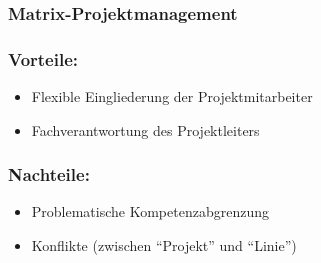 \documentclass[11pt,a4paper]{article}
\begin{document}
\vspace{1cm}
\subsubsection{Matrix-Projektmanagement}
\begin{minipage}[c]{0.5\textwidth}
	\subsubsection*{Vorteile:}

	\begin{itemize}
	\itemsep0em
		\item Flexible Eingliederung der Projektmitarbeiter
		\item Fachverantwortung des Projektleiters
	\end{itemize}
	\subsubsection*{Nachteile:}

	\begin{itemize}
	\itemsep0em
		\item Problematische Kompetenzabgrenzung
		\item Konflikte (zwischen ``Projekt'' und ``Linie'')
	\end{itemize}
\end{minipage}
\end{document}
